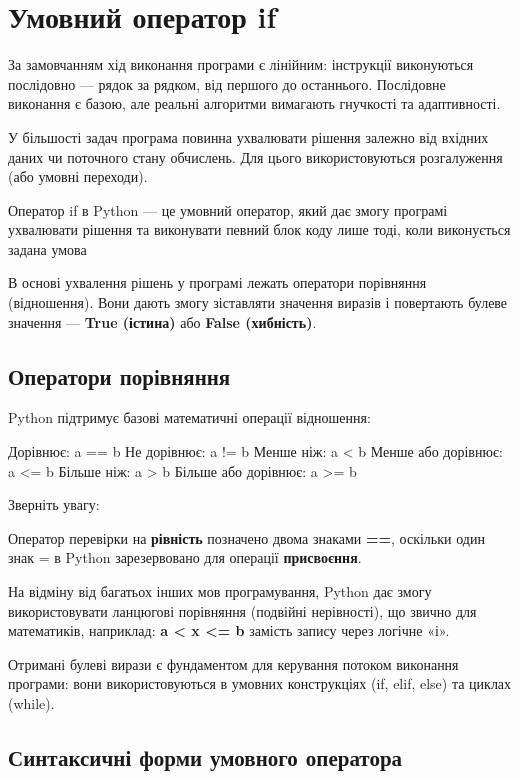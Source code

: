 \chapter{Умовний оператор if}
\justifying
За замовчанням хід виконання програми є лінійним: інструкції виконуються послідовно — рядок за рядком, від першого до останнього. Послідовне виконання є базою, але реальні алгоритми вимагають гнучкості та адаптивності.

У більшості задач програма повинна ухвалювати рішення залежно від вхідних даних чи поточного стану обчислень. Для цього використовуються розгалуження (або умовні переходи).

\begin{defn}{Оператор if в Python — це}
	умовний оператор, який дає змогу програмі ухвалювати рішення та виконувати певний блок коду лише тоді, коли виконується задана умова
\end{defn}

В основі ухвалення рішень у програмі лежать оператори порівняння (відношення). Вони дають змогу зіставляти значення виразів і повертають булеве значення — \textbf{ True (істина)} або \textbf{False (хибність)}.
\section{Оператори порівняння}
Python підтримує базові математичні операції відношення:

\begin{pydef}
Дорівнює:                a == b
Не дорівнює:             a != b
Менше ніж:               a < b
Менше або дорівнює:     a <= b
Більше ніж:              a > b
Більше або дорівнює:    a >= b
\end{pydef}

Зверніть увагу:

Оператор перевірки на \textbf{ рівність} позначено двома знаками \textbf{==}, оскільки один знак = в Python зарезервовано для операції \textbf{присвоєння}.

На відміну від багатьох інших мов програмування, Python дає змогу використовувати ланцюгові порівняння (подвійні нерівності), що звично для математиків, наприклад:\textbf{ a < x <= b} замість запису через логічне «і».

Отримані булеві вирази є фундаментом для керування потоком виконання програми: вони використовуються в умовних конструкціях (if, elif, else) та циклах (while).

\section{Синтаксичні форми умовного оператора}

